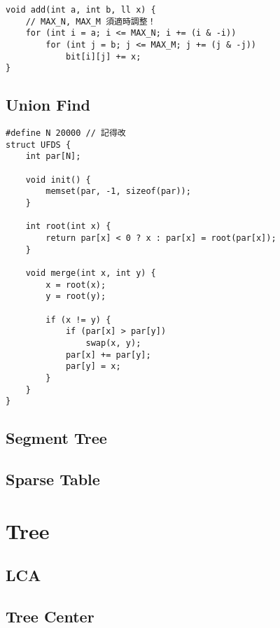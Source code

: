 \documentclass[10pt,oneside]{article}
\begin{document}
\begin{landscape}
\begin{multicols}{2}
\begin{lstlisting}
void add(int a, int b, ll x) {
	// MAX_N, MAX_M 須適時調整！
    for (int i = a; i <= MAX_N; i += (i & -i))
        for (int j = b; j <= MAX_M; j += (j & -j))
            bit[i][j] += x;
}
\end{lstlisting}

\subsection{Union Find}

\begin{lstlisting}
#define N 20000 // 記得改
struct UFDS {
    int par[N];

    void init() {
        memset(par, -1, sizeof(par));
    }

    int root(int x) {
        return par[x] < 0 ? x : par[x] = root(par[x]);
    }

    void merge(int x, int y) {
        x = root(x);
        y = root(y);

        if (x != y) {
            if (par[x] > par[y])
                swap(x, y);
            par[x] += par[y];
            par[y] = x;
        }
    }
}
\end{lstlisting}

\subsection{Segment Tree}


\subsection{Sparse Table}



\section{Tree}

\subsection{LCA}


\subsection{Tree Center}



\end{multicols}
\end{landscape}
\end{document}
